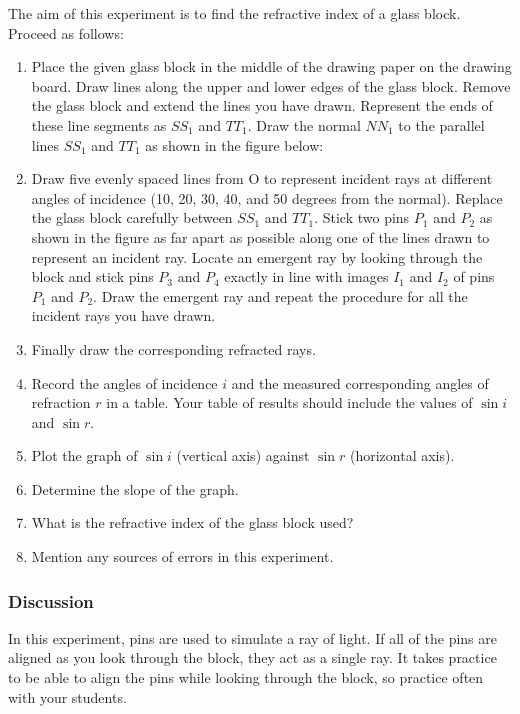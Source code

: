 The aim of this experiment is to find the refractive index of a glass block. Proceed
as follows:
\begin{enumerate}
\item{Place the given glass block in the middle of the drawing paper on the drawing
board. Draw lines along the upper and lower edges of the glass block. Remove the
glass block and extend the lines you have drawn. Represent the ends of these line
segments as $SS_1$ and $TT_1$. Draw the normal $NN_1$ to the parallel lines $SS_1$ and
$TT_1$ as shown in the figure below:


}%

\item{Draw five evenly spaced lines from O to represent incident rays at different
angles of incidence (10, 20, 30, 40, and 50 degrees from the normal). Replace the
glass block carefully between $SS_1$ and $TT_1$. Stick two pins $P_1$ and $P_2$ as shown in
the figure as far apart as possible along one of the lines drawn to represent an
incident ray. Locate an emergent ray by looking through the block and stick pins
$P_3$ and $P_4$ exactly in line with images $I_1$ and $I_2$ of pins $P_1$ and $P_2$. Draw the
emergent ray and repeat the procedure for all the incident rays you have drawn.}
\item{Finally draw the corresponding refracted rays.}


\item{Record the angles of incidence $i$ and the measured corresponding angles of
refraction $r$ in a table. Your table of results should include the values of
$\sin{i}$ and $\sin{r}$.}
\item{Plot the graph of $\sin{i}$ (vertical axis) against $\sin{r}$ (horizontal axis).}
\item{Determine the slope of the graph.}
\item{What is the refractive index of the glass block used?}
\item{Mention any sources of errors in this experiment.}
\end{enumerate}

\subsubsection{Discussion}

In this experiment, pins are used to simulate a ray of light. If all of the pins are
aligned as you look through the block, they act as a single ray. It takes practice to be able
to align the pins while looking through the block, so practice often with your students.

